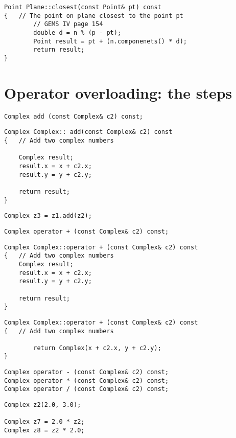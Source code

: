 \begin{lstlisting}
Point Plane::closest(const Point& pt) const
{	// The point on plane closest to the point pt
		// GEMS IV page 154
		double d = n % (p - pt);
		Point result = pt + (n.componenets() * d);
		return result;
}
\end{lstlisting}

\section{Operator overloading: the steps}

\begin{lstlisting}
Complex add (const Complex& c2) const;
\end{lstlisting}

\begin{lstlisting}
Complex Complex:: add(const Complex& c2) const
{	// Add two complex numbers

	Complex result;
	result.x = x + c2.x;
	result.y = y + c2.y;

	return result;
}
\end{lstlisting}

\begin{lstlisting}
Complex z3 = z1.add(z2);
\end{lstlisting}

\begin{lstlisting}
Complex operator + (const Complex& c2) const;
\end{lstlisting}

\begin{lstlisting}
Complex Complex::operator + (const Complex& c2) const
{	// Add two complex numbers
	Complex result;
	result.x = x + c2.x;
	result.y = y + c2.y;

	return result;
}
\end{lstlisting}

\begin{lstlisting}
Complex Complex::operator + (const Complex& c2) const
{	// Add two complex numbers

		return Complex(x + c2.x, y + c2.y);
}
\end{lstlisting}

\begin{lstlisting}
Complex operator - (const Complex& c2) const;
Complex operator * (const Complex& c2) const;
Complex operator / (const Complex& c2) const;
\end{lstlisting}

\begin{lstlisting}
Complex z2(2.0, 3.0);

Complex z7 = 2.0 * z2;
Complex z8 = z2 * 2.0;
\end{lstlisting}

